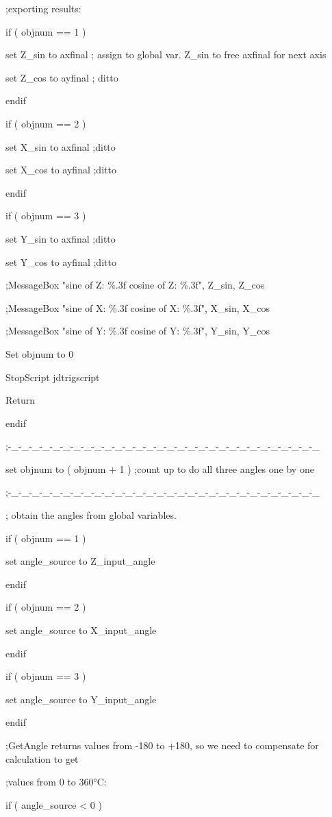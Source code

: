 \documentclass[
]{article}
\begin{document}
;exporting results:

if ( objnum == 1 )

set Z\_sin to axfinal ; assign to global var. Z\_sin to free axfinal for
next axis

set Z\_cos to ayfinal ; ditto

endif

if ( objnum == 2 )

set X\_sin to axfinal ;ditto

set X\_cos to ayfinal ;ditto

endif

if ( objnum == 3 )

set Y\_sin to axfinal ;ditto

set Y\_cos to ayfinal ;ditto

;MessageBox "sine of Z: \%.3f cosine of Z: \%.3f", Z\_sin, Z\_cos

;MessageBox "sine of X: \%.3f cosine of X: \%.3f", X\_sin, X\_cos

;MessageBox "sine of Y: \%.3f cosine of Y: \%.3f", Y\_sin, Y\_cos

Set objnum to 0

StopScript jdtrigscript

Return

endif

;-\_-\_-\_-\_-\_-\_-\_-\_-\_-\_-\_-\_-\_-\_-\_-\_-\_-\_-\_-\_-\_-\_-\_-\_-\_-\_-\_-\_-\_-\_

set objnum to ( objnum + 1 ) ;count up to do all three angles one by one

;-\_-\_-\_-\_-\_-\_-\_-\_-\_-\_-\_-\_-\_-\_-\_-\_-\_-\_-\_-\_-\_-\_-\_-\_-\_-\_-\_-\_-\_-\_

; obtain the angles from global variables.

if ( objnum == 1 )

set angle\_source to Z\_input\_angle

endif

if ( objnum == 2 )

set angle\_source to X\_input\_angle

endif

if ( objnum == 3 )

set angle\_source to Y\_input\_angle

endif

;GetAngle returns values from -180 to +180, so we need to compensate for
calculation to get

;values from 0 to 360°C:

if ( angle\_source \textless{} 0 )
\end{document}
